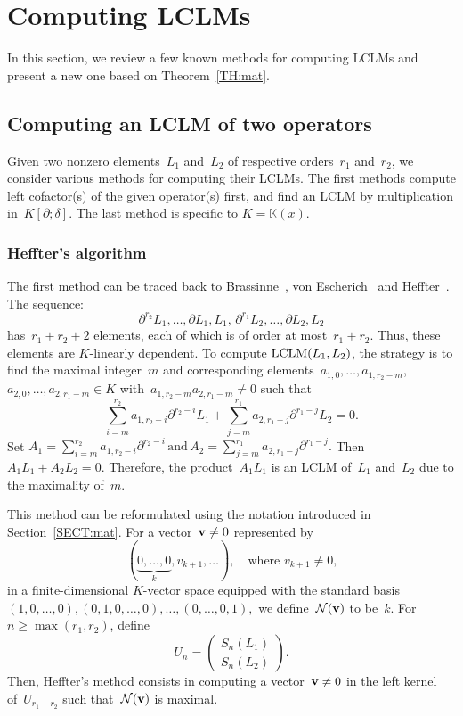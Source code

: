 \documentclass{sig-alt-full}
\def\K {\ensuremath{\mathbb{K}}}
\newcommand{\cN}{ {\cal N}}
\newcommand{\pa} { \partial}
\newcommand{\vv}{ {\bf v}}
\newcommand{\lclm} { {\rm LCLM}}
\begin{document}
\section{Computing LCLMs} \label{SECT:comp}
In this section, we review a few known methods for computing LCLMs and present a new one based on
Theorem~\ref{TH:mat}.

\subsection{Computing an LCLM of two operators} \label{SUBSECT:comp2}
Given two nonzero elements~$L_1$ and~$L_2$ of respective orders~$r_1$ and~$r_2$, we consider various methods for computing their LCLMs.
The first methods  compute left cofactor(s) of
the given operator(s) first, and find an LCLM by multiplication in~$K[\pa; \delta]$. The last method is specific to $K = \K(x)$.

\subsubsection{Heffter's algorithm} 
The first method can be traced back to Brassinne~\cite{Brassinne1864}, von Escherich~\cite{Escherich1883} and Heffter~\cite{Heffter1896}.
The sequence:
\[ \pa^{r_2} L_1, \ldots, \pa L_1, L_1, \, \pa^{r_1} L_2, \ldots, \pa L_2, L_2 \]
has~$r_1 + r_2 + 2$ elements, each of which is of order at most~$r_1+r_2$.
Thus, these elements are $K$-linearly dependent. To compute $\lclm(L_1, L_2)$, the strategy is to 
find the maximal integer~$m$ and corresponding elements~$a_{1,0}, \ldots, a_{1,r_2-m}$, $a_{2,0}, \ldots, a_{2,r_1-m} \in K$
with~$a_{1, r_2-m} a_{2, r_1-m} \neq 0$ such that
\[ \sum_{i=m}^{r_2} a_{1, r_2 -i} \pa^{r_2-i} L_1  + \sum_{j=m}^{r_1} a_{2, r_1-j} \pa^{r_1-j} L_2 = 0. \]
Set
$A_1 = \sum_{i=m}^{r_2} a_{1, r_2 -i} \pa^{r_2-i} \, \text{and} \,
A_2 =  \sum_{j=m}^{r_1} a_{2, r_1-j} \pa^{r_1-j}.$
Then~$A_1 L_1 + A_2 L_2 = 0$. Therefore, the product~$A_1L_1$ is an LCLM of~$L_1$ and~$L_2$ due to the maximality of~$m$.

This method can be reformulated using the notation introduced in Section~\ref{SECT:mat}.
For a vector~$\vv \neq 0$ represented by
\[ (\underbrace{0, \ldots, 0}_k, v_{k+1}, \ldots ), \quad \mbox{where $v_{k+1} \neq 0$,} \]
in a finite-dimensional $K$-vector space equipped with the standard basis
$(1, 0, \ldots, 0), (0,1, 0, \ldots, 0), \ldots, (0, \ldots, 0, 1),$
\sloppy we define~$\cN(\vv)$ to be~$k$.
For~$n \ge \max(r_1, r_2)$, define
\begin{equation} \label{EQ:mat2}
U_{n} = \left( \begin{array}{c}
           S_{n}(L_1) \\
           S_{n}(L_2)
           \end{array} \right).
\end{equation}
Then, Heffter's method consists in computing a vector~$\vv \neq 0$ in the left kernel of~$U_{r_1+r_2}$
such that~$\cN(\vv)$ is maximal.
\end{document}
